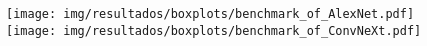 \begin{figure}[h!]
	\texttt{[image: img/resultados/boxplots/benchmark\_of\_AlexNet.pdf]}
	\texttt{[image: img/resultados/boxplots/benchmark\_of\_ConvNeXt.pdf]}
	\caption{}
	\label{fig:Time_of_Purely Convolutional}
\end{figure}

